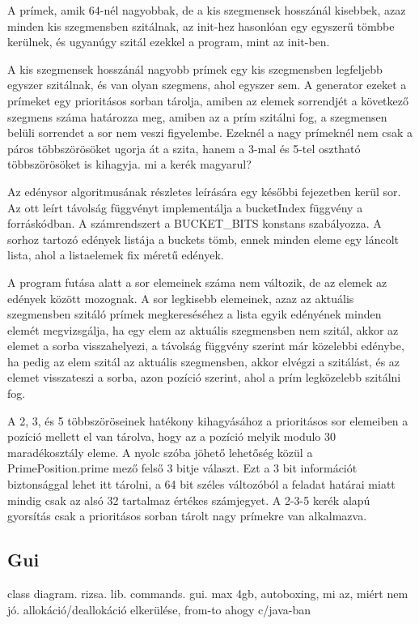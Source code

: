 A prímek, amik $64$-nél nagyobbak, de a
kis szegmensek hosszánál kisebbek, azaz minden kis szegmensben
szitálnak, az init-hez hasonlóan egy egyszerű tömbbe
kerülnek, és ugyanúgy szitál ezekkel a program, mint
az init-ben.

A kis szegmensek hosszánál nagyobb prímek
egy kis szegmensben legfeljebb egyszer szitálnak,
és van olyan szegmens, ahol egyszer sem.
A generator ezeket a prímeket egy prioritásos
sorban tárolja, amiben az elemek sorrendjét
a következő szegmens száma határozza meg,
amiben az a prím szitálni fog, a szegmensen
belüli sorrendet a sor nem veszi figyelembe.
Ezeknél a nagy prímeknél nem csak a páros
többszörösöket ugorja át a szita, hanem
a 3-mal és 5-tel osztható többszörösöket is
kihagyja. {\color{red}mi a kerék magyarul?}

Az edénysor algoritmusának részletes leírására egy későbbi fejezetben kerül sor.
Az ott leírt távolság függvényt implementálja a bucketIndex függvény
a forráskódban. A számrendszert a BUCKET\_BITS konstans szabályozza.
A sorhoz tartozó edények listája a buckets tömb, ennek minden eleme
egy láncolt lista, ahol a listaelemek fix méretű edények.

A program futása alatt a sor elemeinek száma nem változik,
de az elemek az edények között mozognak. A sor legkisebb elemeinek,
azaz az aktuális szegmensben szitáló prímek megkereséséhez
a lista egyik edényének minden elemét
megvizsgálja, ha egy elem az aktuális
szegmensben nem szitál, akkor az elemet a sorba visszahelyezi,
a távolság függvény szerint már közelebbi edénybe, ha pedig
az elem szitál az aktuális szegmensben, akkor elvégzi a szitálást,
és az elemet visszateszi a sorba, azon pozíció szerint, ahol a
prím legközelebb szitálni fog.

A 2, 3, és 5 többszöröseinek hatékony kihagyásához
a prioritásos sor elemeiben a pozíció mellett el van tárolva,
hogy az a pozíció melyik modulo 30 maradékosztály eleme.
A nyolc szóba jöhető lehetőség közül a PrimePosition.prime mező
felső 3 bitje választ. Ezt a 3 bit információt biztonsággal
lehet itt tárolni, a 64 bit széles változóból a feladat határai
miatt mindig csak az alsó 32 tartalmaz értékes számjegyet.
A {\color{red}2-3-5 kerék} alapú gyorsítás csak a prioritásos sorban
tárolt nagy prímekre van alkalmazva.

\subsection{Gui}

{\color{red}class diagram. rizsa. lib. commands. gui. max 4gb, autoboxing, mi az, miért nem jó. allokáció/deallokáció elkerülése, from-to ahogy c/java-ban}

